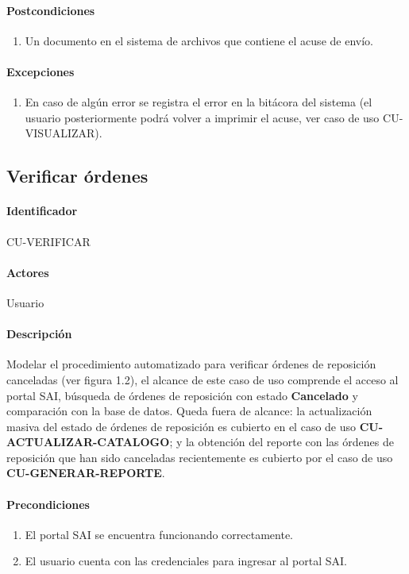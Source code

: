 \paragraph{Postcondiciones}
\begin{enumerate}
  \item Un documento en el sistema de archivos que contiene el acuse de envío.
\end{enumerate}
\paragraph{Excepciones}
\begin{enumerate}
  \item En caso de algún error se registra el error en la bitácora del sistema (el usuario posteriormente podrá volver a imprimir el acuse, ver caso de uso CU-VISUALIZAR).
\end{enumerate}


\subsection{Verificar órdenes}
\paragraph{Identificador}
CU-VERIFICAR
\paragraph{Actores}
Usuario
\paragraph{Descripción}
Modelar el procedimiento automatizado para verificar órdenes de reposición canceladas (ver figura 1.2), el alcance de este caso de uso comprende el acceso al portal SAI, búsqueda de órdenes de reposición con estado \textbf{Cancelado} y comparación con la base de datos. Queda fuera de alcance: la actualización masiva del estado de órdenes de reposición es cubierto en el caso de uso \textbf{CU-ACTUALIZAR-CATALOGO}; y la obtención del reporte con las órdenes de reposición que han sido canceladas recientemente es cubierto por el caso de uso \textbf{CU-GENERAR-REPORTE}.
\paragraph{Precondiciones}
\begin{enumerate}
  \item El portal SAI se encuentra funcionando correctamente.
  \item El usuario cuenta con las credenciales para ingresar al portal SAI.
\end{enumerate}
